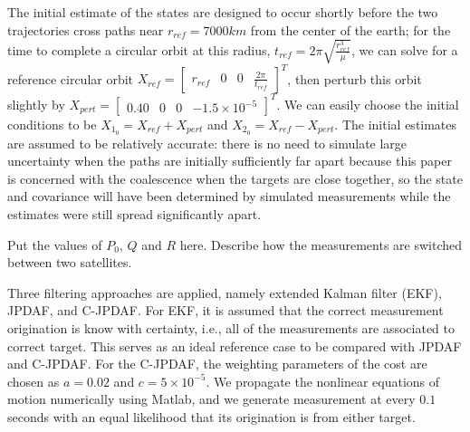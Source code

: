 \documentclass[letterpaper, 10pt, conference]{ieeeconf}
\newcommand{\EditTL}[1]{{\color{red}\protect #1}}
\begin{document}
The initial estimate of the states are designed to occur shortly before the two trajectories cross paths near $r_{ref}=7000km$ from the center of the earth; for the time to complete a circular orbit at this radius, $t_{ref}=2\pi \sqrt{\frac{r_{ref}^3}{\mu}}$, we can solve for a reference circular orbit $X_{ref}=\begin{bmatrix} r_{ref} & 0 & 0 & \frac{2\pi}{t_{ref}}\end{bmatrix}^T$, then perturb this orbit slightly by $X_{pert}=\begin{bmatrix} 0.40 & 0 & 0 & -1.5\times10^{-5}\end{bmatrix}^T$. We can easily choose the initial conditions to be $X_{1_0}= X_{ref}+X_{pert}$ and $X_{2_0}= X_{ref}-X_{pert}$. The initial estimates are assumed to be relatively accurate: there is no need to simulate large uncertainty when the paths are initially sufficiently far apart because this paper is concerned with the coalescence when the targets are close together, so the state and covariance will have been determined by simulated measurements while the estimates were still spread significantly apart.

\EditTL{Put the values of $P_0$, $Q$ and $R$ here. Describe how the measurements are switched between two satellites. }


Three filtering approaches are applied, namely extended Kalman filter (EKF), JPDAF, and C-JPDAF. For EKF, it is assumed that the correct measurement origination is know with certainty, i.e., all of the measurements are associated to correct target. This serves as an ideal reference case to be compared with JPDAF and C-JPDAF. For the C-JPDAF, the weighting parameters of the cost are chosen as $a=0.02$ and $c=5\times10^{-5}$. We propagate the nonlinear equations of motion numerically using Matlab, and we generate measurement at every $0.1$ seconds with an equal likelihood that its origination is from either target.
\end{document}
